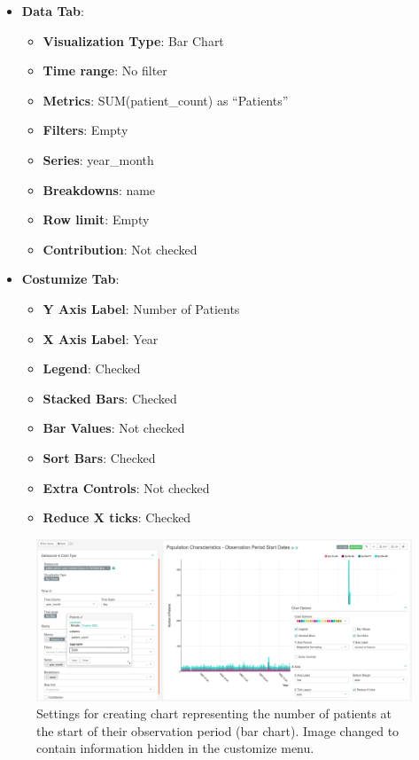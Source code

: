 \documentclass[]{book}
\providecommand{\tightlist}{%
  \setlength{\itemsep}{0pt}\setlength{\parskip}{0pt}}
\begin{document}
\begin{itemize}
\tightlist
\item
  \textbf{Data Tab}:

  \begin{itemize}
  \tightlist
  \item
    \textbf{Visualization Type}: Bar Chart
  \item
    \textbf{Time range}: No filter
  \item
    \textbf{Metrics}: SUM(patient\_count) as ``Patients''
  \item
    \textbf{Filters}: Empty
  \item
    \textbf{Series}: year\_month
  \item
    \textbf{Breakdowns}: name
  \item
    \textbf{Row limit}: Empty
  \item
    \textbf{Contribution}: Not checked
  \end{itemize}
\item
  \textbf{Costumize Tab}:

  \begin{itemize}
  \tightlist
  \item
    \textbf{Y Axis Label}: Number of Patients
  \item
    \textbf{X Axis Label}: Year
  \item
    \textbf{Legend}: Checked
  \item
    \textbf{Stacked Bars}: Checked
  \item
    \textbf{Bar Values}: Not checked
  \item
    \textbf{Sort Bars}: Checked
  \item
    \textbf{Extra Controls}: Not checked
  \item
    \textbf{Reduce X ticks}: Checked
  \end{itemize}
\end{itemize}

\begin{figure}
\includegraphics[width=1\linewidth]{images/populationCharacteristicsObservationPeriodStartDates} \caption{Settings for creating chart representing the number of patients at the start of their observation period (bar chart). Image changed to contain information hidden in the customize menu.}\label{fig:populationCharacteristicsObservationPeriodStartDates}
\end{figure}
\end{document}
